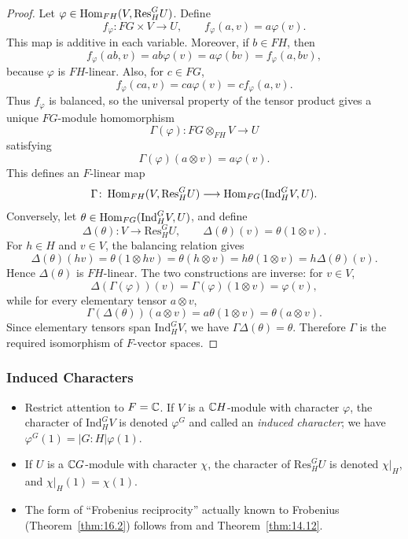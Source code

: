 \documentclass[../Odyssey_Project.tex]{subfiles}
\begin{document}
\begin{proof}
    Let $\varphi\in\operatorname{Hom}_{FH}(V,\mathrm{Res}_H^G U)$. Define
    \[
        f_\varphi\colon FG\times V\to U,
        \qquad
        f_\varphi(a,v)=a\varphi(v).
    \]
    This map is additive in each variable. Moreover, if $b\in FH$, then
    \[
        f_\varphi(ab,v)
        =
        ab\varphi(v)
        =
        a\varphi(bv)
        =
        f_\varphi(a,bv),
    \]
    because $\varphi$ is $FH$-linear. Also, for $c\in FG$,
    \[
        f_\varphi(ca,v)=ca\varphi(v)=c f_\varphi(a,v).
    \]
    Thus $f_\varphi$ is balanced, so the universal property of the tensor product gives a unique $FG$-module homomorphism
    \[
        \Gamma(\varphi)\colon FG\otimes_{FH}V\to U
    \]
    satisfying
    \[
        \Gamma(\varphi)(a\otimes v)=a\varphi(v).
    \]
    This defines an $F$-linear map
    \[
        \Gamma\colon
        \operatorname{Hom}_{FH}(V,\mathrm{Res}_H^G U)
        \longrightarrow
        \operatorname{Hom}_{FG}(\mathrm{Ind}_H^G V,U).
    \]
    Conversely, let $\theta\in\operatorname{Hom}_{FG}(\mathrm{Ind}_H^G V,U)$, and define
    \[
        \Delta(\theta)\colon V\to\mathrm{Res}_H^G U,
        \qquad
        \Delta(\theta)(v)=\theta(1\otimes v).
    \]
    For $h\in H$ and $v\in V$, the balancing relation gives
    \[
        \Delta(\theta)(hv)
        =
        \theta(1\otimes hv)
        =
        \theta(h\otimes v)
        =
        h\theta(1\otimes v)
        =
        h\Delta(\theta)(v).
    \]
    Hence $\Delta(\theta)$ is $FH$-linear. The two constructions are inverse: for $v\in V$,
    \[
        \Delta(\Gamma(\varphi))(v)
        =
        \Gamma(\varphi)(1\otimes v)
        =
        \varphi(v),
    \]
    while for every elementary tensor $a\otimes v$,
    \[
        \Gamma(\Delta(\theta))(a\otimes v)
        =
        a\theta(1\otimes v)
        =
        \theta(a\otimes v).
    \]
    Since elementary tensors span $\mathrm{Ind}_H^G V$, we have $\Gamma\Delta(\theta)=\theta$. Therefore $\Gamma$ is the required isomorphism of $F$-vector spaces.
\end{proof}

\subsubsection*{Induced Characters}
\begin{itemize}
    \item Restrict attention to $F = \mathbb{C}$. If $V$ is a $\mathbb{C} H$-module with character $\varphi$, the character of $\mathrm{Ind}_H^G V$ is denoted $\varphi^G$ and called an \emph{induced character}; we have $\varphi^G(1) = |G : H| \varphi(1)$.
    \item If $U$ is a $\mathbb{C} G$-module with character $\chi$, the character of $\mathrm{Res}_H^G U$ is denoted $\chi|_H$, and $\chi|_H(1) = \chi(1)$.
    \item The form of ``Frobenius reciprocity'' actually known to Frobenius (Theorem~\ref{thm:16.2}) follows from  and Theorem~\ref{thm:14.12}.
\end{itemize}
\end{document}
